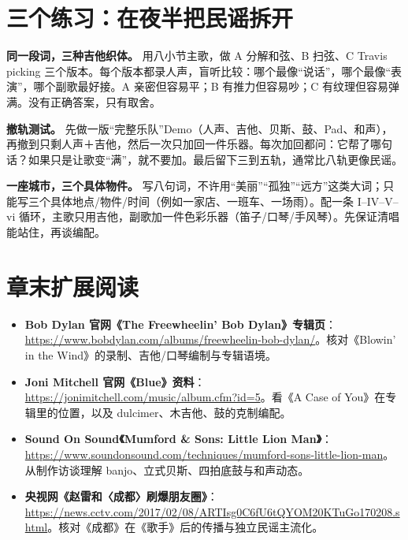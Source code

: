 \section{三个练习：在夜半把民谣拆开}
\label{sec:folk-practice}

\begin{exercise}
\textbf{同一段词，三种吉他织体。} 用八小节主歌，做 A 分解和弦、B 扫弦、C Travis picking 三个版本。每个版本都录人声，盲听比较：哪个最像“说话”，哪个最像“表演”，哪个副歌最好接。A 亲密但容易平；B 有推力但容易吵；C 有纹理但容易弹满。没有正确答案，只有取舍。
\end{exercise}

\begin{exercise}
\textbf{撤轨测试。} 先做一版“完整乐队”Demo（人声、吉他、贝斯、鼓、Pad、和声），再撤到只剩人声＋吉他，然后一次只加回一件乐器。每次加回都问：它帮了哪句话？如果只是让歌变“满”，就不要加。最后留下三到五轨，通常比八轨更像民谣。
\end{exercise}

\begin{exercise}
\textbf{一座城市，三个具体物件。} 写八句词，不许用“美丽”“孤独”“远方”这类大词；只能写三个具体地点/物件/时间（例如一家店、一班车、一场雨）。配一条 I–IV–V–vi 循环，主歌只用吉他，副歌加一件色彩乐器（笛子/口琴/手风琴）。先保证清唱能站住，再谈编配。
\end{exercise}

\section{章末扩展阅读}
\label{sec:folk-reading}

\begin{sloppypar}
\begin{itemize}
\item \textbf{Bob Dylan 官网《The Freewheelin' Bob Dylan》专辑页}：\url{https://www.bobdylan.com/albums/freewheelin-bob-dylan/}。核对《Blowin' in the Wind》的录制、吉他/口琴编制与专辑语境。
\item \textbf{Joni Mitchell 官网《Blue》资料}：\url{https://jonimitchell.com/music/album.cfm?id=5}。看《A Case of You》在专辑里的位置，以及 dulcimer、木吉他、鼓的克制编配。
\item \textbf{Sound On Sound《Mumford \& Sons: Little Lion Man》}：\url{https://www.soundonsound.com/techniques/mumford-sons-little-lion-man}。从制作访谈理解 banjo、立式贝斯、四拍底鼓与和声动态。
\item \textbf{央视网《赵雷和〈成都〉刷爆朋友圈》}：\url{https://news.cctv.com/2017/02/08/ARTIsg0C6fU6tQYOM20KTuGo170208.shtml}。核对《成都》在《歌手》后的传播与独立民谣主流化。
\end{itemize}
\end{sloppypar}

